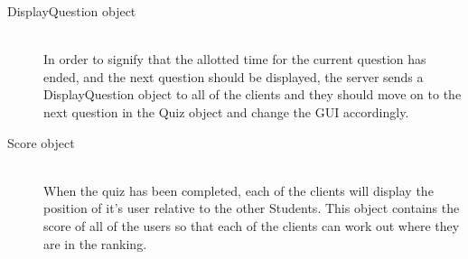 \begin{description}
	\item[DisplayQuestion object]\hfill \\ In order to signify that the
		allotted time for the current question has ended, and the next question
		should be displayed, the server sends a DisplayQuestion object to all
		of the clients and they should move on to the next question in the Quiz
		object and change the GUI accordingly.

	\item[Score object]\hfill \\ When the quiz has been completed, each of the
		clients will display the position of it's user relative to the other
		Students. This object contains the score of all of the users so that
		each of the clients can work out where they are in the ranking.
\end{description}
